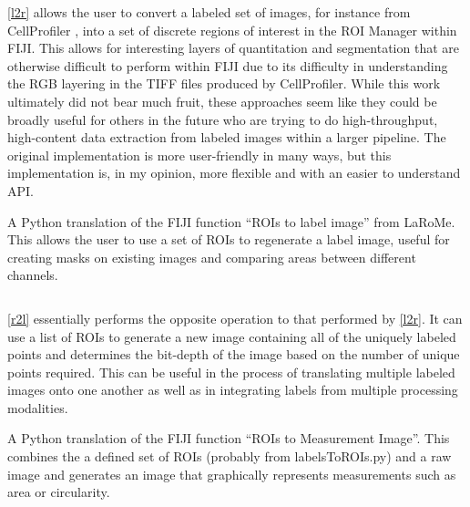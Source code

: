 \autoref{l2r} allows the user to convert a labeled set of images, for instance from CellProfiler \citep{Carpenter2006, Kamentsky2011, McQuin2018, Stirling2021}, into a set of discrete regions of interest in the ROI Manager within FIJI. This allows for interesting layers of quantitation and segmentation that are otherwise difficult to perform within FIJI due to its difficulty in understanding the RGB layering in the TIFF files produced by CellProfiler. While this work ultimately did not bear much fruit, these approaches seem like they could be broadly useful for others in the future who are trying to do high\hyp{}throughput, high\hyp{}content data extraction from labeled images within a larger pipeline. The original implementation is more user\hyp{}friendly in many ways, but this implementation is, in my opinion, more flexible and with an easier to understand API.

\begin{code}
\caption{A Python translation of the FIJI function ``ROIs to label image'' from LaRoMe. This allows the user to use a set of ROIs to regenerate a label image, useful for creating masks on existing images and comparing areas between different channels.}
\label{r2l}

\inputminted[breaklines,frame=single,fontsize=\small]{python}{source/ROIsTolabels.py}

\end{code}

\autoref{r2l} essentially performs the opposite operation to that performed by \autoref{l2r}. It can use a list of ROIs to generate a new image containing all of the uniquely labeled points and determines the bit\hyp{}depth of the image based on the number of unique points required. This can be useful in the process of translating multiple labeled images onto one another as well as in integrating labels from multiple processing modalities.

\begin{code}
\caption{A Python translation of the FIJI function ``ROIs to Measurement Image''. This combines the a defined set of ROIs (probably from labelsToROIs.py) and a raw image and generates an image that graphically represents measurements such as area or circularity.}
\label{r2m}

\inputminted[breaklines,frame=single,fontsize=\small]{python}{source/ROIsToMap.py}

\end{code}

